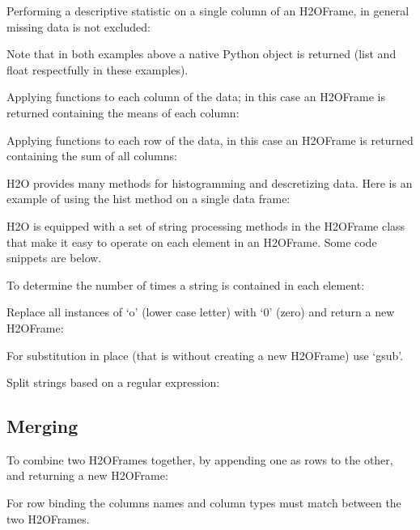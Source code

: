 Performing a descriptive statistic on a single column of an H2OFrame, in general missing data is
not excluded:


Note that in both examples above a native Python object is returned (list and float respectfully
in these examples).

Applying functions to each column of the data;
in this case an H2OFrame is returned containing the means of each column:


Applying functions to each row of the data,
in this case an H2OFrame is returned containing the sum of all columns:


H2O provides many methods for histogramming and descretizing data.
Here is an example of using the hist method on a single data frame:


H2O is equipped with a set of string processing methods in the H2OFrame class
that make it easy to operate on each element in an H2OFrame.  Some code snippets are below.

To determine the number of times a string is contained in each element:


Replace all instances of `o' (lower case letter) with `0' (zero) and return a new H2OFrame:


For substitution in place (that is without creating a new H2OFrame) use `gsub'.

Split strings based on a regular expression:



\subsection{Merging}
To combine two H2OFrames together, by appending one as rows to the other, and returning a new H2OFrame:


For row binding the columns names and column types must match between the two H2OFrames.

